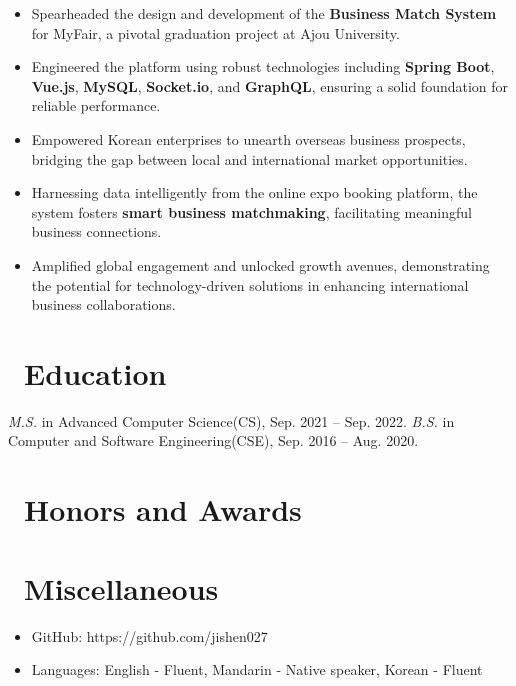 \documentclass{resume}
\begin{document}
\begin{itemize}
  \item Spearheaded the design and development of the \textbf{Business Match System} for MyFair, a pivotal graduation project at Ajou University.
  \item Engineered the platform using robust technologies including \textbf{Spring Boot}, \textbf{Vue.js}, \textbf{MySQL}, \textbf{Socket.io}, and \textbf{GraphQL}, ensuring a solid foundation for reliable performance.
  \item Empowered Korean enterprises to unearth overseas business prospects, bridging the gap between local and international market opportunities.
  \item Harnessing data intelligently from the online expo booking platform, the system fosters \textbf{smart business matchmaking}, facilitating meaningful business connections.
  \item Amplified global engagement and unlocked growth avenues, demonstrating the potential for technology-driven solutions in enhancing international business collaborations.
\end{itemize}

\section{\faGraduationCap\ Education}
\textit{M.S.} in Advanced Computer Science(CS), Sep. 2021 -- Sep. 2022.
\textit{B.S.} in Computer and Software Engineering(CSE), Sep. 2016 -- Aug. 2020.

\section{\faHeartO\ Honors and Awards}

\section{\faInfo\ Miscellaneous}
\begin{itemize}[parsep=0.5ex]
  \item GitHub: https://github.com/jishen027
  \item Languages: English - Fluent, Mandarin - Native speaker, Korean - Fluent
\end{itemize}

%
%
\end{document}
